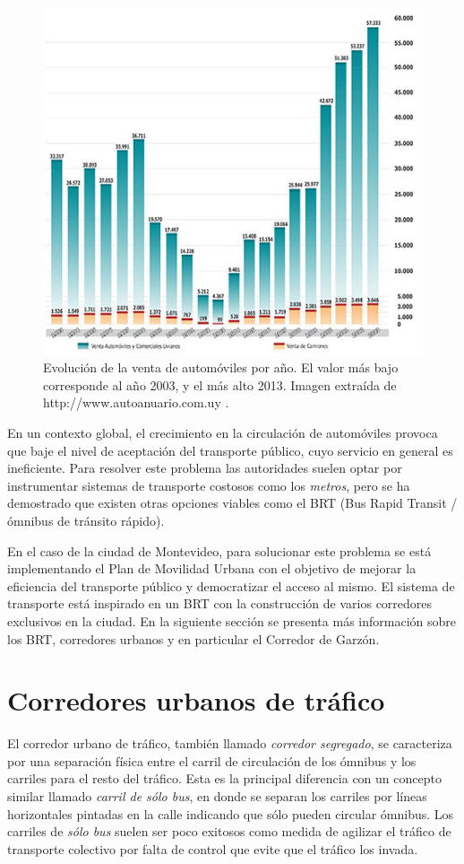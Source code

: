 \begin{figure}[H]
	\centering
	\includegraphics[width=0.9\linewidth]{Figures/ventas_autos}
	\caption[Evolución de la venta de automóviles en Uruguay]{Evolución de la venta de automóviles por año. El valor más bajo corresponde al año 2003, y el más alto 2013. Imagen extraída de {http://www.autoanuario.com.uy} .	
	}
	\label{fig:ventas_autos}
\end{figure}

En un contexto global, el crecimiento en la circulación de automóviles provoca que baje el nivel de aceptación del transporte público, cuyo servicio en general es ineficiente. Para resolver este problema las autoridades suelen optar por instrumentar sistemas de transporte costosos como los \emph{metros}, pero se ha demostrado que existen otras opciones viables como el BRT (Bus Rapid Transit / ómnibus de tránsito rápido)\citep{BRT_Dial}.

En el caso de la ciudad de Montevideo, para solucionar este problema se está implementando el Plan de Movilidad Urbana \citep{PlanMovilidad} con el objetivo de mejorar la eficiencia del transporte público y democratizar el acceso al mismo. El sistema de transporte está inspirado en un BRT con la construcción de varios corredores exclusivos en la ciudad. En la siguiente sección se presenta más información sobre los BRT, corredores urbanos y en particular el Corredor de Garzón.

\section{Corredores urbanos de tráfico}
El corredor urbano de tráfico, también llamado \emph{corredor segregado}, se caracteriza por una separación física entre el carril de circulación de los ómnibus y los carriles para el resto del tráfico. 
Esta es la principal diferencia con un concepto similar llamado \emph{carril de sólo bus}, en donde se separan los carriles por líneas horizontales pintadas en la calle indicando que sólo pueden circular ómnibus. Los carriles de \emph{sólo bus} suelen ser poco exitosos como medida de agilizar el tráfico de transporte colectivo por falta de control que evite que el tráfico los invada. 

